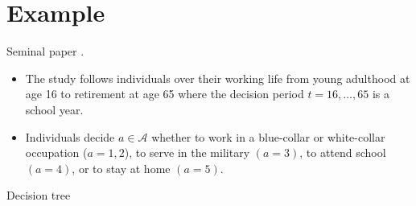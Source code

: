\section{Example}
\begin{frame}{Seminal paper}\vspace{0.75cm}
.\vspace{0.5cm}

\begin{itemize}
	\item The study follows individuals over their working life from young adulthood at age 16 to retirement at age 65 where the decision period $t = 16, \dots, 65$  is a school year.
	\item Individuals decide $a\in\mathcal{A}$ whether to work in a blue-collar or white-collar occupation ($a = 1, 2$), to serve in the military $(a = 3)$, to attend school $(a = 4)$, or to stay at home $(a = 5)$.
\end{itemize}


\end{frame}
\begin{frame}{Decision tree}

\begin{figure}
  \scalebox{0.60}{}
\end{figure}
\end{frame}

